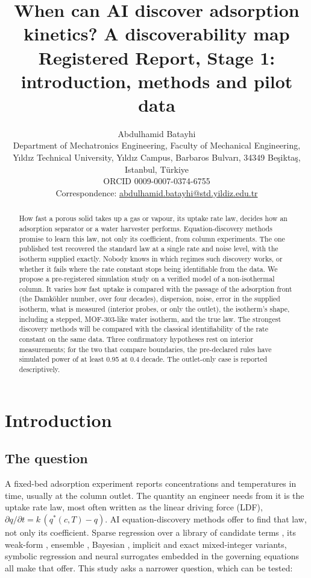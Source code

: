 \documentclass[11pt]{article}
\title{When can AI discover adsorption kinetics? A discoverability map\\[6pt]
\large Registered Report, Stage 1: introduction, methods and pilot data}
\author{Abdulhamid Batayhi\\[4pt]
\small Department of Mechatronics Engineering, Faculty of Mechanical Engineering,\\
\small Y\i{}ld\i{}z Technical University, Y\i{}ld\i{}z Campus, Barbaros Bulvar\i{},
34349 Be\c{s}ikta\c{s}, Istanbul, T\"urkiye\\[4pt]
\small ORCID 0009-0007-0374-6755\\
\small Correspondence: \href{mailto:abdulhamid.batayhi@std.yildiz.edu.tr}{abdulhamid.batayhi@std.yildiz.edu.tr}}
\date{}
\newcommand{\qs}{q^{*}}
\begin{document}
\maketitle

\begin{abstract}
\noindent How fast a porous solid takes up a gas or vapour, its uptake rate law, decides how
an adsorption separator or a water harvester performs. Equation-discovery methods promise
to learn this law, not only its coefficient, from column experiments. The one published
test recovered the standard law at a single rate and noise level, with the isotherm
supplied exactly. Nobody knows in which regimes
such discovery works, or whether it fails where the rate constant stops being
identifiable from the data. We propose a pre-registered simulation study on a verified
model of a non-isothermal column. It varies how fast uptake is compared with the passage
of the adsorption front (the Damk\"ohler number, over four decades), dispersion,
noise, error in the supplied isotherm, what is measured (interior probes, or
only the outlet), the isotherm's shape, including a stepped, MOF-303-like water isotherm,
and the true law. The strongest discovery methods will be compared with the classical
identifiability of the rate constant on the same data. Three confirmatory hypotheses rest
on interior measurements; for the two that compare boundaries, the pre-declared rules have
simulated power of at least 0.95 at 0.4 decade. The outlet-only case is reported
descriptively.
\end{abstract}

\section{Introduction}
\label{sec:intro}

\subsection*{The question}
A fixed-bed adsorption experiment reports concentrations and temperatures in time,
usually at the column outlet. The quantity an engineer needs from it is the uptake rate
law, most often written as the linear driving force (LDF), $\partial q/\partial t =
k\,(\qs(c,T) - q)$. AI equation-discovery methods offer to find that law, not only its
coefficient. Sparse regression over a library of candidate terms
\citep{brunton2016,rudy2016}, its weak-form \citep{messenger2021ode,messenger2021pde,
reinbold2020}, ensemble \citep{fasel2022}, Bayesian \citep{hirsh2021}, implicit
\citep{kaheman2020} and exact mixed-integer \citep{bertsimas2022} variants, symbolic
regression \citep{cranmer2023,udrescu2020} and neural surrogates embedded in the
governing equations \citep{santana2023} all make that offer. This study asks a narrower
question, which can be tested:
\end{document}
